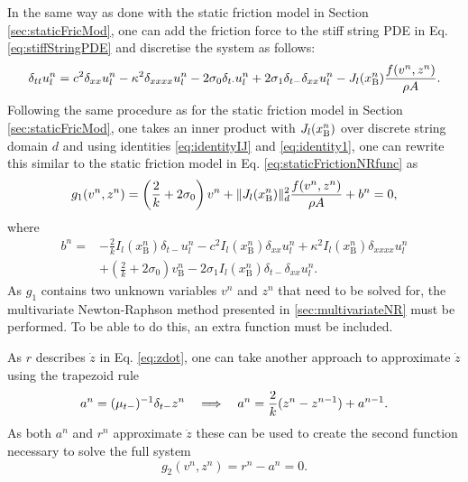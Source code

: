 In the same way as done with the static friction model in Section \ref{sec:staticFricMod}, one can add the friction force to the stiff string PDE in Eq. \eqref{eq:stiffStringPDE} and discretise the system as follows:
%
\begin{equation}\label{eq:elastoStiffStringFDS}
    \delta_{tt} u_l^n = c^2 \delta_{xx} u_l^n - \kappa^2 \delta_{xxxx} u_l^n - 2 \sigma_{0} \delta_{t\cdot} u_l^n + 2 \sigma_{1}\delta_{t-}\delta_{xx} u_l^n - J_l(x_{\text{B}}^n)\frac{f(v^n,z^n)}{\rho A}.
\end{equation}
Following the same procedure as for the static friction model in Section \ref{sec:staticFricMod}, one takes an inner product with $J_l(x_{\text{B}}^n)$ over discrete string domain $d$ and using identities \eqref{eq:identityIJ} and \eqref{eq:identity1}, one can rewrite this similar to the static friction model in Eq. \eqref{eq:staticFrictionNRfunc} as
%
\begin{equation}
    g_1(v^n,z^n) = \left(\frac{2}{k} + 2\sigma_{0}\right)v^n + \lVert J_l(x_{\text{B}}^n)\rVert_d^2\frac{f(v^n,z^n)}{\rho A}+ b^n= 0,
\end{equation}
where
\begin{align*}
    b^n =&-\frac{2}{k}I_l(x_\text{B}^n)\delta_{t-}u_l^n - c^2 I_l(x_\text{B}^n)\delta_{xx} u_l^n +\kappa^2I_l(x_\text{B}^n)\delta_{xxxx} u_l^n\\
    &+\left(\frac{2}{k}+ 2\sigma_0\right)v_\text{B}^n-2\sigma_1I_l(x_\text{B}^n)\delta_{t-}\delta_{xx}u_l^n.
\end{align*}
As $g_1$ contains two unknown variables $v^n$ and $z^n$ that need to be solved for, the multivariate Newton-Raphson method presented in \ref{sec:multivariateNR} must be performed. To be able to do this, an extra function must be included. 

As $r$ describes $\dot z$ in Eq. \eqref{eq:zdot}, one can take another approach to approximate $\dot z$ using the trapezoid rule \cite{theBible}
\begin{equation}
    a^n = (\mu_{t-})^{-1}\delta_{t-} z^n \quad \Longrightarrow\quad a^n = \frac{2}{k}(z^n - z^{n-1}) + a^{n-1}.
\end{equation}
As both $a^n$ and $r^n$ approximate $\dot z$ these can be used to create the second function necessary to solve the full system
\begin{equation}
    g_2(v^n, z^n) = r^n - a^n = 0.
\end{equation}

